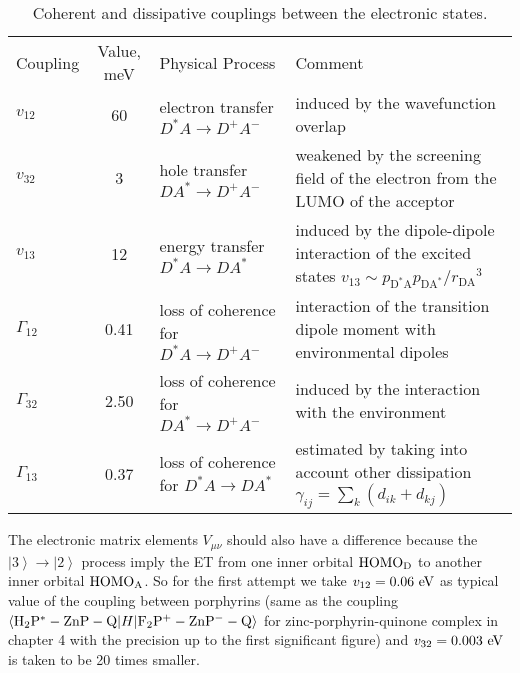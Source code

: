 \documentclass[12pt,twoside,a4paper]{report}
\begin{document}
\begin{footnotesize}
\begin{table}[!h] 
\caption[Coherent and dissipative couplings between the electronic states]
{\small Coherent and dissipative couplings between the electronic states.} 
\label{tab:coup} 
\begin{tabular}{p{2cm}cp{3cm}p{7cm}} \small \\ \hline 
 \small
Coupling & Value, meV & Physical Process & Comment \\ \hline 
$v_{12}$ & 60 & {electron transfer $D^*A  \to  D^+A^-$} & {induced by} 
the wavefunction overlap \\  
 \small
$v_{32}$ & 3 & {hole transfer $DA^*  \to  D^+A^-$} & {weakened by} the 
screening field of the electron from the LUMO of the acceptor \\  
 \small
$v_{13}$ & 12 & {energy transfer $D^*A  \to  DA^*$} & {induced by} the 
dipole-dipole interaction of the excited states $v_{13} \sim p_{\mathrm{D^*A}%
}p_{\mathrm{DA^*}}/{r_{\mathrm{DA}}}^3$ \\  
 \small
$\Gamma_{12}$ & 0.41 & {loss of coherence} for $D^*A  \to  D^+A^-$ &  
interaction of the transition dipole moment with environmental 
dipoles \\  
 \small
$\Gamma_{32}$ & 2.50 & {loss of coherence} for $DA^*  \to  D^+A^-$ & {%
induced by} the interaction with the environment \\  
 \small
$\Gamma_{13}$ & 0.37 & {loss of coherence} for $D^*A  \to  DA^*$ & {%
estimated by} taking into account other dissipation $\gamma_{ij}= 
\sum \limits_k(d_{ik}+d_{kj})$ \\ \hline 
\end{tabular} 
\end{table} 
\end{footnotesize}
\normalsize 


The electronic matrix elements $V_{\mu \nu}$
should also have a difference
because the 
$\left| 3 \right> \to \left| 2 \right>$
process imply the ET from one inner orbital ${\rm HOMO_D}$
to another inner orbital  ${\rm HOMO_A}$.
So for the first attempt we take $v_{12}=0.06~{\rm eV}$ 
as typical value of the coupling between porphyrins
(same as the coupling 
$\left<
 {\rm H_2P^*-ZnP-Q}
 |H|
 {\rm F_2P^+-ZnP^--Q}
 \right>$
for zinc-porphyrin-quinone complex in chapter 4
with the precision up to the first significant figure)
and $v_{32}=0.003~{\rm eV}$ is taken to be 20 times smaller.
\end{document}
